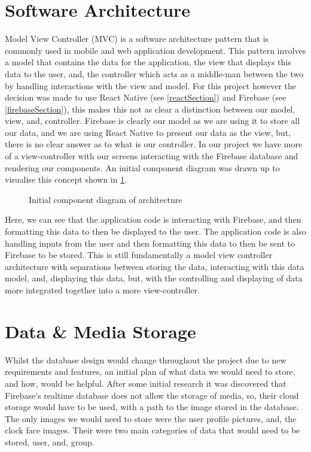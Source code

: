 \section{Software Architecture}
Model View Controller (MVC) \cite{mvc} is a software architecture pattern that is commonly used in mobile and web application development. This pattern involves a model that contains the data for the application, the view that displays this data to the user, and, the controller which acts as a middle-man between the two by handling interactions with the view and model. For this project however the decision was made to use React Native (see \ref{reactSection}) and Firebase (see \ref{firebaseSection}), this makes this not  as clear a distinction between our model, view, and, controller. Firebase is clearly our model as we are using it to store all our data, and we are using React Native to present our data as the view, but, there is no clear answer as to what is our controller. In our project we have more of a view-controller with our screens interacting with the Firebase database and rendering our components. An initial component diagram was drawn up to visualise this concept shown in \ref{fig:compDiag}.
\begin{figure}[!htbp]
    \centering
    \begin{subfigure}[b]{0.6\textwidth}
    \end{subfigure}
    \caption{Initial component diagram of architecture} 
    \label{fig:compDiag}
\end{figure}
\FloatBarrier
Here, we can see that the application code is interacting with Firebase, and then formatting this data to then be displayed to the user. The application code is also handling inputs from the user and then formatting this data to then be sent to Firebase to be stored. This is still fundamentally a model view controller architecture with separations between storing the data, interacting with this data model, and, displaying this data, but, with the controlling and displaying of data more integrated together into a more view-controller.

\section{Data \& Media Storage}\label{dataMedStor}
Whilst the database design would change throughout the project due to new requirements and features, an initial plan of what data we would need to store, and how, would be helpful. After some initial research it was discovered that Firebase's realtime database does not allow the storage of media, so, their cloud storage would have to be used, with a path to the image stored in the database. The only images we would need to store were the user profile pictures, and, the clock face images. Their were two main categories of data that would need to be stored, user, and, group.

